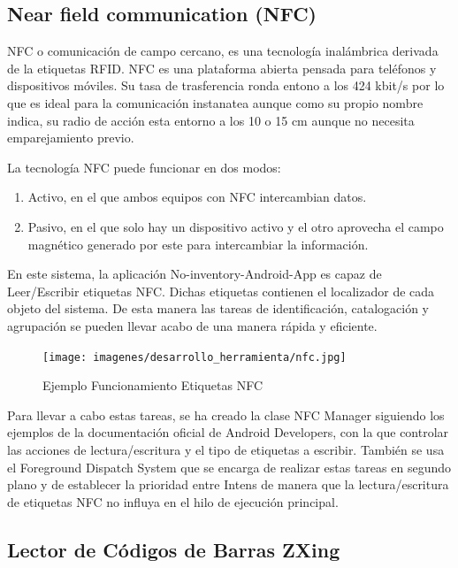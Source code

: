\documentclass[a4paper,11pt]{book}
\begin{document}
\subsection{Near field communication (NFC)}
NFC\cite{nfc} o comunicación de campo cercano, es una tecnología inalámbrica derivada de la etiquetas RFID. NFC es una plataforma abierta pensada para teléfonos  y dispositivos móviles. Su tasa de trasferencia ronda entono a los  424 kbit/s por lo que es ideal para la comunicación instanatea aunque como su propio nombre indica, su radio de acción esta entorno a los 10 o 15 cm aunque no necesita emparejamiento previo. 

La tecnología NFC puede funcionar en dos modos:

\begin{enumerate}
\item Activo, en el que ambos equipos con NFC intercambian datos. 
\item Pasivo, en el que solo hay un dispositivo activo y el otro aprovecha el campo magnético generado por este para intercambiar la información.
\end{enumerate}

En este sistema, la aplicación No-inventory-Android-App es capaz de Leer/Escribir etiquetas NFC. Dichas etiquetas contienen el localizador de cada objeto del sistema. De esta manera las tareas de identificación, catalogación y agrupación  se pueden llevar acabo de una manera rápida y eficiente.

\begin{figure}[H] 
\centering 
\texttt{[image: imagenes/desarrollo\_herramienta/nfc.jpg]}
\caption{ Ejemplo Funcionamiento Etiquetas NFC\cite{nfc4}}
\end{figure}

Para llevar a cabo estas tareas, se ha creado la clase NFC Manager siguiendo los ejemplos de la documentación oficial de Android Developers\cite{nfc2}, con la que controlar las acciones de lectura/escritura y el tipo de etiquetas a escribir. También se usa el Foreground Dispatch System\cite{nfc3} que se encarga de realizar estas tareas en segundo plano  y de establecer la prioridad entre Intens de manera que la lectura/escritura de etiquetas NFC no influya en el hilo de ejecución principal. 


 

\subsection{Lector de Códigos de Barras ZXing}
\end{document}
